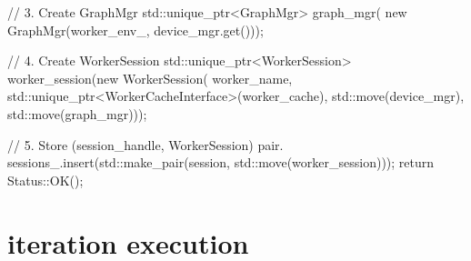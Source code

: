 \begin{content}
\begin{leftbar}
\begin{c++}
{  // 3. Create GraphMgr
  std::unique_ptr<GraphMgr> graph_mgr(
      new GraphMgr(worker_env_, device_mgr.get()));
  
  // 4. Create WorkerSession
  std::unique_ptr<WorkerSession> worker_session(new WorkerSession(
      worker_name, std::unique_ptr<WorkerCacheInterface>(worker_cache),
      std::move(device_mgr), std::move(graph_mgr)));

  // 5. Store (session\_handle, WorkerSession) pair.
  sessions_.insert(std::make_pair(session, std::move(worker_session)));
  return Status::OK();
}
\end{c++}
\end{leftbar}

\end{content}

\section{iteration execution}

